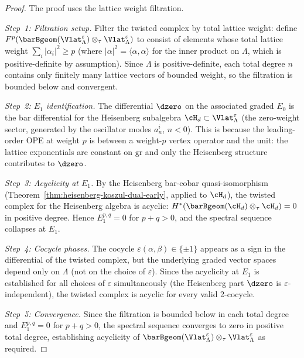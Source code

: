 \begin{proof}
The proof uses the lattice weight filtration.

\emph{Step~1: Filtration setup.}
Filter the twisted complex by total lattice weight: define $F^p(\barBgeom(\Vlat_\Lambda^\varepsilon) \otimes_\tau \Vlat_\Lambda^\varepsilon)$ to consist of elements whose total lattice weight $\sum_i |\alpha_i|^2 \geq p$ (where $|\alpha|^2 = \langle\alpha,\alpha\rangle$ for the inner product on $\Lambda$, which is positive-definite by assumption). Since $\Lambda$ is positive-definite, each total degree $n$ contains only finitely many lattice vectors of bounded weight, so the filtration is bounded below and convergent.

\emph{Step~2: $E_1$ identification.}
The differential $\dzero$ on the associated graded $E_0$ is the bar differential for the Heisenberg subalgebra $\cH_d \subset \Vlat_\Lambda^\varepsilon$ (the zero-weight sector, generated by the oscillator modes $a^i_n$, $n < 0$). This is because the leading-order OPE at weight $p$ is between a weight-$p$ vertex operator and the unit: the lattice exponentials are constant on $\mathrm{gr}$ and only the Heisenberg structure contributes to $\dzero$.

\emph{Step~3: Acyclicity at $E_1$.}
By the Heisenberg bar-cobar quasi-isomorphism (Theorem~\ref{thm:heisenberg-koszul-dual-early}, applied to $\cH_d$), the twisted complex for the Heisenberg algebra is acyclic: $H^*(\barBgeom(\cH_d) \otimes_\tau \cH_d) = 0$ in positive degree. Hence $E_1^{p,q} = 0$ for $p+q > 0$, and the spectral sequence collapses at $E_1$.

\emph{Step~4: Cocycle phases.}
The cocycle $\varepsilon(\alpha,\beta) \in \{\pm 1\}$ appears as a sign in the differential of the twisted complex, but the underlying graded vector spaces depend only on $\Lambda$ (not on the choice of $\varepsilon$). Since the acyclicity at $E_1$ is established for all choices of $\varepsilon$ simultaneously (the Heisenberg part $\dzero$ is $\varepsilon$-independent), the twisted complex is acyclic for every valid 2-cocycle.

\emph{Step~5: Convergence.}
Since the filtration is bounded below in each total degree and $E_1^{p,q} = 0$ for $p+q > 0$, the spectral sequence converges to zero in positive total degree, establishing acyclicity of $\barBgeom(\Vlat_\Lambda^\varepsilon) \otimes_\tau \Vlat_\Lambda^\varepsilon$ as required.
\end{proof}

